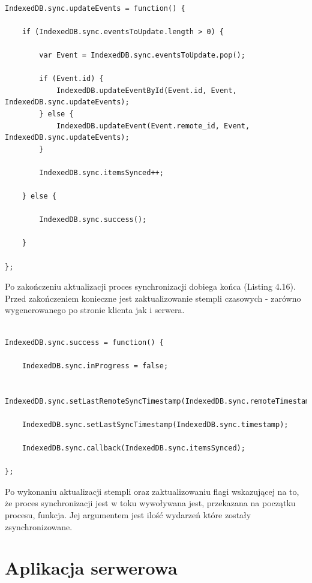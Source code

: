 \begin{lstlisting}[caption=Aktualizacja wydarzeń przechowywanych w lokalnej bazie danych., label=amb, captionpos=b]

IndexedDB.sync.updateEvents = function() {

	if (IndexedDB.sync.eventsToUpdate.length > 0) {

    	var Event = IndexedDB.sync.eventsToUpdate.pop();

    	if (Event.id) {
        	IndexedDB.updateEventById(Event.id, Event, IndexedDB.sync.updateEvents);
    	} else {
        	IndexedDB.updateEvent(Event.remote_id, Event, IndexedDB.sync.updateEvents);
    	}

    	IndexedDB.sync.itemsSynced++;

	} else {

    	IndexedDB.sync.success();

	}

};

\end{lstlisting}

Po zakończeniu aktualizacji proces synchronizacji dobiega końca (Listing 4.16). Przed zakończeniem konieczne jest zaktualizowanie stempli czasowych - zarówno wygenerowanego po stronie klienta jak i serwera.

\begin{lstlisting}[caption=Kod finalizujący proces synchronizacji., label=amb, captionpos=b]

IndexedDB.sync.success = function() {

	IndexedDB.sync.inProgress = false;

	IndexedDB.sync.setLastRemoteSyncTimestamp(IndexedDB.sync.remoteTimestamp);
    
	IndexedDB.sync.setLastSyncTimestamp(IndexedDB.sync.timestamp);

	IndexedDB.sync.callback(IndexedDB.sync.itemsSynced);

};

\end{lstlisting}

Po wykonaniu aktualizacji stempli oraz zaktualizowaniu flagi wskazującej na to, że proces synchronizacji jest w toku wywoływana jest, przekazana na początku procesu, funkcja. Jej argumentem jest ilość wydarzeń które zostały zsynchronizowane.

\section{Aplikacja serwerowa}
\label{sec:apSerw}

